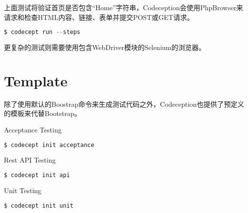 上面测试将验证首页是否包含“Home”字符串，Codeception会使用PhpBrowser来请求和检查HTML内容、链接、表单并提交POST或GET请求。

\begin{lstlisting}[language=PHP]
$ codecept run --steps
\end{lstlisting}

更复杂的测试则需要使用包含WebDriver模块的Selenium的浏览器。


\chapter{Template}

除了使用默认的Boostrap命令来生成测试代码之外，Codeception也提供了预定义的模板来代替Bootstrap。

\begin{compactitem}
\item Acceptance Testing

\begin{lstlisting}[language=PHP]
$ codecept init acceptance
\end{lstlisting}

\item Rest API Testing


\begin{lstlisting}[language=PHP]
$ codecept init api
\end{lstlisting}


\item Unit Testing


\begin{lstlisting}[language=PHP]
$ codecept init unit
\end{lstlisting}


\end{compactitem}

